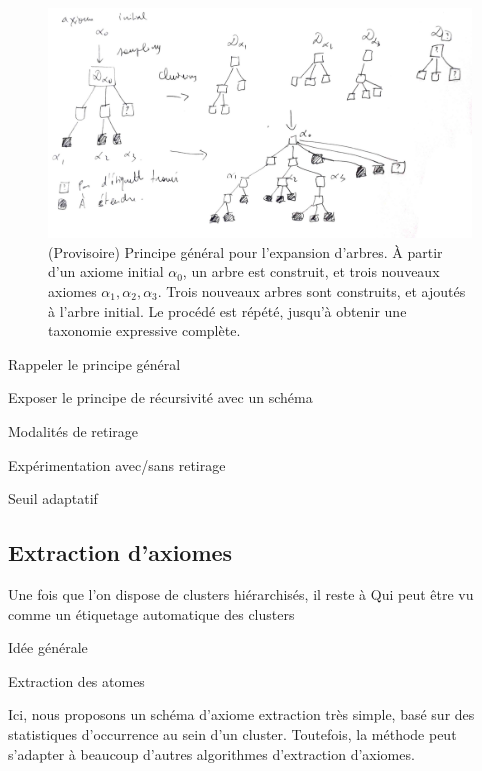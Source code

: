 \begin{figure}
    \centering
    \includegraphics[width=\textwidth]{img/expressive_extraction_overview.jpg}
    \caption{(Provisoire) Principe général pour l'expansion d'arbres. À partir d'un axiome initial $\alpha_0$, un arbre est construit, et trois nouveaux axiomes $\alpha_1, \alpha_2, \alpha_3$. Trois nouveaux arbres sont construits, et ajoutés à l'arbre initial. Le procédé est répété, jusqu'à obtenir une taxonomie expressive complète.}
    \label{fig:my_label}
\end{figure}



Rappeler le principe général

Exposer le principe de récursivité avec un schéma

Modalités de retirage

Expérimentation avec/sans retirage

Seuil adaptatif


\subsection{Extraction d'axiomes}
\label{subsec:texp-exaxiom}

Une fois que l'on dispose de clusters hiérarchisés, il reste à 
Qui peut être vu comme un étiquetage automatique des clusters

Idée générale

Extraction des atomes

Ici, nous proposons un schéma d'axiome extraction très simple, basé sur des statistiques d'occurrence au sein d'un cluster. Toutefois, la méthode peut s'adapter à beaucoup d'autres algorithmes d'extraction d'axiomes. 

